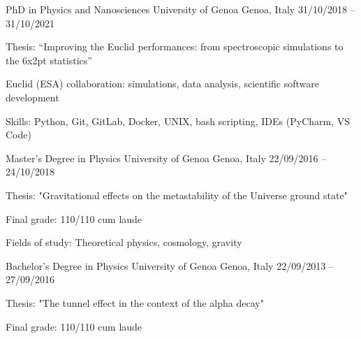 


\begin{cventries}


\cventry
{PhD in Physics and Nanosciences} %
{University of Genoa} %
{Genoa, Italy} %
{31/10/2018 -- 31/10/2021} %
{ %
\begin{cvitems}
  \item {Thesis: ``Improving the Euclid performances: from spectroscopic simulations to the 6x2pt statistics''}
  \item {Euclid (ESA) collaboration: simulations, data analysis, scientific software development}
  \item {Skills: Python, Git, GitLab, Docker, UNIX, bash scripting, IDEs (PyCharm, VS Code)}
\end{cvitems}
}


\cventry
{Master's Degree in Physics} %
{University of Genoa} %
{Genoa, Italy} %
{22/09/2016 -- 24/10/2018} %
{ %
\begin{cvitems}
  \item {Thesis: "Gravitational effects on the metastability of the Universe ground state"}
  \item {Final grade: 110/110 cum laude}
  \item {Fields of study: Theoretical physics, cosmology, gravity}
\end{cvitems}
}


\cventry
{Bachelor's Degree in Physics} %
{University of Genoa} %
{Genoa, Italy} %
{22/09/2013 -- 27/09/2016} %
{ %
\begin{cvitems}
  \item {Thesis: "The tunnel effect in the context of the alpha decay"}
  \item {Final grade: 110/110 cum laude}
\end{cvitems}
}


\end{cventries}
